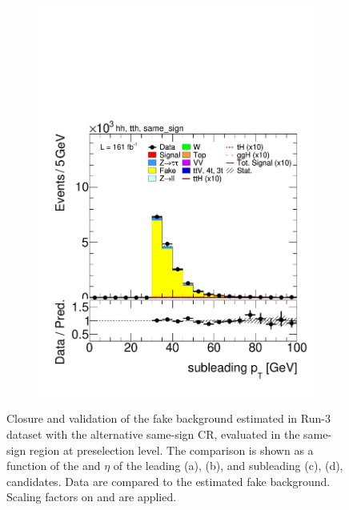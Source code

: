 \begin{figure}[htbp]
\begin{subfigure}[b]{0.45\textwidth}
    \includegraphics[width=\textwidth]{images/same_sign_same_sign_run3/plot_tau_1_pt_hh_tth_22_23_24_same_sign.pdf}
    \caption{}
  \end{subfigure}
  \caption{
    Closure and validation of the fake background estimated in Run-3 dataset with the alternative same-sign \tauhadhad CR, evaluated in the same-sign region at preselection level.
    The comparison is shown as a function of the \pt and $\eta$ of the leading (a), (b), and subleading (c), (d), \tauhad candidates. 
    Data are compared to the estimated fake background. Scaling factors on \ztautau and \ttbar are applied.
  }
  \label{fig:closure_validation_same_sign_run3}
\end{figure}
  
